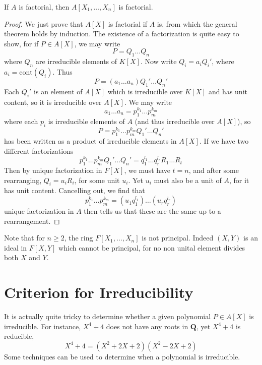 \begin{corollary}
    If $A$ is factorial, then $A[X_1, \dots, X_n]$ is factorial.
\end{corollary}
\begin{proof}
    We just prove that $A[X]$ is factorial if $A$ is, from which the general theorem holds by induction. The existence of a factorization is quite easy to show, for if $P \in A[X]$, we may write
    \[ P = Q_1 \dots Q_n \]
    where $Q_n$ are irreducible elements of $K[X]$. Now write $Q_i = a_i Q_i'$, where $a_i = \text{cont}(Q_i)$. Thus
    \[ P = (a_1 \dots a_n) Q_1' \dots Q_n' \]
    Each $Q_i'$ is an element of $A[X]$ which is irreducible over $K[X]$ and has unit content, so it is irreducible over $A[X]$. We may write
    \[ a_1 \dots a_n = p_1^{k_1} \dots p_m^{k_m} \]
    where each $p_i$ is irreducible elements of $A$ (and thus irreducible over $A[X]$), so
    \[ P = p_1^{k_1} \dots p_m^{k_m} Q_1' \dots Q_n' \]
    has been written as a product of irreducible elements in $A[X]$. If we have two different factorizations
    \[ p_1^{k_1} \dots p_m^{k_m} Q_1' \dots Q_n' = q_1^{l_1} \dots q_r^{l_r} R_1 \dots R_t \]
    Then by unique factorization in $F[X]$, we must have $t = n$, and after some rearranging, $Q_i = u_i R_i$, for some unit $u_i$. Yet $u_i$ must also be a unit of $A$, for it has unit content. Cancelling out, we find that
    \[ p_1^{k_1} \dots p_m^{k_m} = (u_1 q_1^{l_1}) \dots (u_r q_r^{l_r}) \]
    unique factorization in $A$ then tells us that these are the same up to a rearrangement.
\end{proof}

Note that for $n \geq 2$, the ring $F[X_1, \dots, X_n]$ is not principal. Indeed $(X,Y)$ is an ideal in $F[X,Y]$ which cannot be principal, for no non unital element divides both $X$ and $Y$.





\section{Criterion for Irreducibility}

It is actually quite tricky to determine whether a given polynomial $P \in A[X]$ is irreducible. For instance, $X^4 + 4$ does not have any roots in $\mathbf{Q}$, yet $X^4 + 4$ is reducible,
%
\[ X^4 + 4 = (X^2 + 2X + 2)(X^2 - 2X + 2) \]
%
Some techniques can be used to determine when a polynomial is irreducible.

